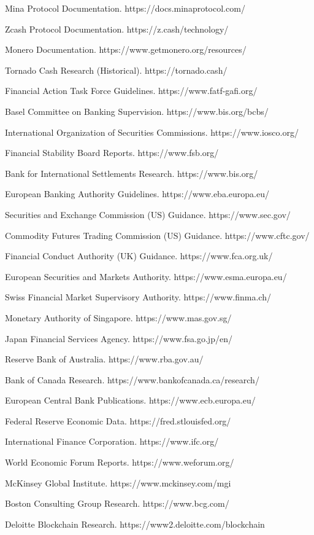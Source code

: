 \documentclass[12pt]{article}
\begin{document}
Mina Protocol Documentation. https://docs.minaprotocol.com/

Zcash Protocol Documentation. https://z.cash/technology/

Monero Documentation. https://www.getmonero.org/resources/

Tornado Cash Research (Historical). https://tornado.cash/

Financial Action Task Force Guidelines. https://www.fatf-gafi.org/

Basel Committee on Banking Supervision. https://www.bis.org/bcbs/

International Organization of Securities Commissions. https://www.iosco.org/

Financial Stability Board Reports. https://www.fsb.org/

Bank for International Settlements Research. https://www.bis.org/

European Banking Authority Guidelines. https://www.eba.europa.eu/

Securities and Exchange Commission (US) Guidance. https://www.sec.gov/

Commodity Futures Trading Commission (US) Guidance. https://www.cftc.gov/

Financial Conduct Authority (UK) Guidance. https://www.fca.org.uk/

European Securities and Markets Authority. https://www.esma.europa.eu/

Swiss Financial Market Supervisory Authority. https://www.finma.ch/

Monetary Authority of Singapore. https://www.mas.gov.sg/

Japan Financial Services Agency. https://www.fsa.go.jp/en/

Reserve Bank of Australia. https://www.rba.gov.au/

Bank of Canada Research. https://www.bankofcanada.ca/research/

European Central Bank Publications. https://www.ecb.europa.eu/

Federal Reserve Economic Data. https://fred.stlouisfed.org/

International Finance Corporation. https://www.ifc.org/

World Economic Forum Reports. https://www.weforum.org/

McKinsey Global Institute. https://www.mckinsey.com/mgi

Boston Consulting Group Research. https://www.bcg.com/

Deloitte Blockchain Research. https://www2.deloitte.com/blockchain
\end{document}
